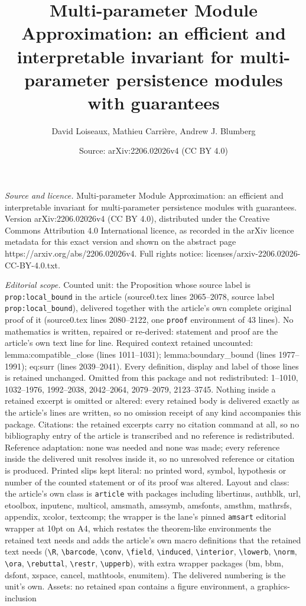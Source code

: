 \documentclass[10pt,a4paper]{amsart}
\title[Multi-parameter Module Approximation: an efficient and inter]{Multi-parameter Module Approximation: an efficient and interpretable invariant for multi-parameter persistence modules with guarantees}
\author{David Loiseaux, Mathieu Carri\`ere, Andrew J. Blumberg}
\date{Source: arXiv:2206.02026v4 (CC BY 4.0)}
\begin{document}
\maketitle

\noindent\emph{Source and licence.} Multi-parameter Module Approximation: an efficient and interpretable invariant for multi-parameter persistence modules with guarantees. Version arXiv:2206.02026v4 (CC BY 4.0), distributed under the Creative Commons Attribution 4.0 International licence, as recorded in the arXiv licence metadata for this exact version and shown on the abstract page https://arxiv.org/abs/2206.02026v4. Full rights notice: licenses/arxiv-2206.02026-CC-BY-4.0.txt.\par\smallskip

\noindent\textit{Editorial scope.} Counted unit: the Proposition whose source label is \texttt{prop:local\_bound} in the article (source0.tex lines 2065--2078, source label \texttt{prop:local\_bound}), delivered together with the article's own complete original proof of it (source0.tex lines 2080--2122, one \texttt{proof} environment of 43 lines). No mathematics is written, repaired or re-derived: statement and proof are the article's own text line for line. Required context retained uncounted: lemma:compatible\_close (lines 1011--1031); lemma:boundary\_bound (lines 1977--1991); eq:surr (lines 2039--2041). Every definition, display and label of those lines is retained unchanged. Omitted from this package and not redistributed: 1--1010, 1032--1976, 1992--2038, 2042--2064, 2079--2079, 2123--3745. Nothing inside a retained excerpt is omitted or altered: every retained body is delivered exactly as the article's lines are written, so no omission receipt of any kind accompanies this package. Citations: the retained excerpts carry no citation command at all, so no bibliography entry of the article is transcribed and no reference is redistributed. Reference adaptation: none was needed and none was made; every reference inside the delivered unit resolves inside it, so no unresolved reference or citation is produced. Printed slips kept literal: no printed word, symbol, hypothesis or number of the counted statement or of its proof was altered. Layout and class: the article's own class is \texttt{article} with packages including libertinus, authblk, url, etoolbox, inputenc, multicol, amsmath, amssymb, amsfonts, amsthm, mathrsfs, appendix, xcolor, textcomp; the wrapper is the lane's pinned \texttt{amsart} editorial wrapper at 10pt on A4, which restates the theorem-like environments the retained text needs and adds the article's own macro definitions that the retained text needs (\texttt{\textbackslash R}, \texttt{\textbackslash barcode}, \texttt{\textbackslash conv}, \texttt{\textbackslash field}, \texttt{\textbackslash induced}, \texttt{\textbackslash interior}, \texttt{\textbackslash lowerb}, \texttt{\textbackslash norm}, \texttt{\textbackslash ora}, \texttt{\textbackslash rebuttal}, \texttt{\textbackslash restr}, \texttt{\textbackslash upperb}), with extra wrapper packages (bm, bbm, dsfont, xspace, cancel, mathtools, enumitem). The delivered numbering is the unit's own. Assets: no retained span contains a figure environment, a graphics-inclusion 
\end{document}

